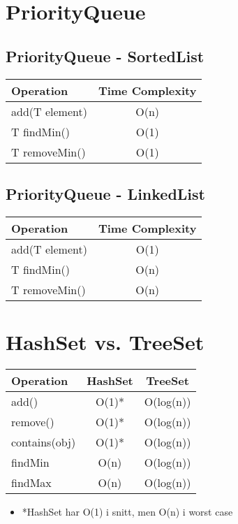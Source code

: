 \documentclass{article}
\begin{document}
\section{PriorityQueue}
\subsection{PriorityQueue - SortedList}
\begin{table}[h!]
\centering
\begin{tabular}{|l|c|}
\hline
\textbf{Operation} & \textbf{Time Complexity} \\
\hline
add(T element) & O(n) \\
\hline
T findMin() & O(1) \\
\hline
T removeMin() & O(1) \\
\hline
\end{tabular}
\end{table}
\subsection{PriorityQueue - LinkedList}
\begin{table}[h!]
\centering
\begin{tabular}{|l|c|}
\hline
\textbf{Operation} & \textbf{Time Complexity} \\
\hline
add(T element) & O(1) \\
\hline
T findMin() & O(n) \\
\hline
T removeMin() & O(n) \\
\hline
\end{tabular}
\end{table}

\newpage


\section{HashSet vs. TreeSet}
\begin{table}[h!]
\centering
\begin{tabular}{|l|c|c|}
\hline
\textbf{Operation} & \textbf{HashSet} & \textbf{TreeSet} \\
\hline
add() & O(1)* & O(log(n)) \\
\hline
remove() & O(1)* & O(log(n)) \\
\hline
contains(obj) & O(1)* & O(log(n)) \\
\hline
findMin & O(n) & O(log(n))\\
\hline
findMax & O(n) & O(log(n))\\
\hline
\end{tabular}
\end{table}
\begin{itemize}
  \item *HashSet har O(1) i snitt, men O(n) i worst case
\end{itemize}
\end{document}
